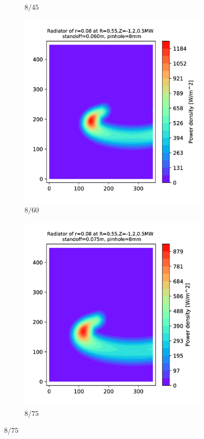 \begin{figure}
\begin{subfigure}{0.3\textwidth}
         \caption{$8/45$}
         \label{fig:8_45}
     \end{subfigure}
     \hfill
     \begin{subfigure}{0.3\textwidth}
         \centering
         \includegraphics[trim={70 0 110 0},clip,width=\textwidth]{Chapters/appendix1/figs/8_60.png}
         \caption{$8/60$}
         \label{fig:8_60}
     \end{subfigure}
     \hfill
     \begin{subfigure}{0.325\textwidth}
         \centering
         \includegraphics[trim={70 0 0 0},clip,width=\textwidth]{Chapters/appendix1/figs/8_75.png}
         \caption{$8/75$}
         \label{fig:8_75}
     \end{subfigure}


\end{figure}
